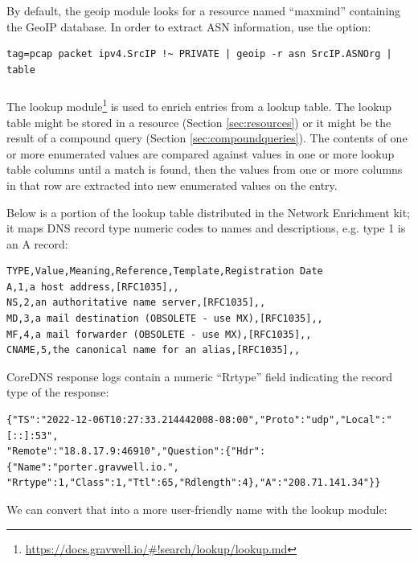 By default, the geoip module looks for a resource named ``maxmind'' containing the GeoIP database. In order to extract ASN information, use the  option:

\begin{verbatim}
tag=pcap packet ipv4.SrcIP !~ PRIVATE | geoip -r asn SrcIP.ASNOrg | table
\end{verbatim}

\subsubsection{\emph{}}

The lookup module\footnote{\href{https://docs.gravwell.io/\#!search/lookup/lookup.md}{https://docs.gravwell.io/\#!search/lookup/lookup.md}} is used to enrich entries from a lookup table. The lookup table might be stored in a resource (Section \ref{sec:resources}) or it might be the result of a compound query (Section \ref{sec:compoundqueries}). The contents of one or more enumerated values are compared against values in one or more lookup table columns until a match is found, then the values from one or more columns in that row are extracted into new enumerated values on the entry.

Below is a portion of the  lookup table distributed in the Network Enrichment kit; it maps DNS record type numeric codes to names and descriptions, e.g. type 1 is an A record:

\begin{verbatim}
TYPE,Value,Meaning,Reference,Template,Registration Date
A,1,a host address,[RFC1035],,
NS,2,an authoritative name server,[RFC1035],,
MD,3,a mail destination (OBSOLETE - use MX),[RFC1035],,
MF,4,a mail forwarder (OBSOLETE - use MX),[RFC1035],,
CNAME,5,the canonical name for an alias,[RFC1035],,
\end{verbatim}

CoreDNS response logs contain a numeric ``Rrtype'' field indicating the record type of the response:

\begin{verbatim}
{"TS":"2022-12-06T10:27:33.214442008-08:00","Proto":"udp","Local":"[::]:53",
"Remote":"18.8.17.9:46910","Question":{"Hdr":{"Name":"porter.gravwell.io.",
"Rrtype":1,"Class":1,"Ttl":65,"Rdlength":4},"A":"208.71.141.34"}}
\end{verbatim}

We can convert that into a more user-friendly name with the lookup module:

